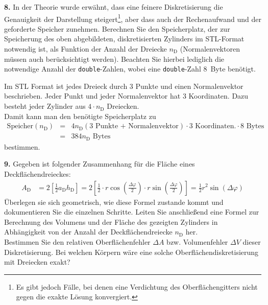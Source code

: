 \documentclass[Protokollheft.tex]{subfiles}
\begin{document}
	
	\begin{framed}
		\noindent \textbf{8.} In der Theorie wurde erwähnt, dass eine feinere Diskretisierung die Genauigkeit der Darstellung steigert\footnote{Es gibt jedoch Fälle, bei denen eine Verdichtung des Oberflächengitters nicht gegen die exakte Lösung konvergiert.}, aber dass auch der Rechenaufwand und der geforderte Speicher zunehmen.
		Berechnen Sie den Speicherplatz, der zur Speicherung des oben abgebildeten, diskretisierten Zylinders im STL-Format notwendig ist, als Funktion der Anzahl der Dreiecke $n_\mathrm{D}$ (Normalenvektoren müssen auch berücksichtigt werden). Beachten Sie hierbei lediglich die notwendige Anzahl der \lstinline{double}-Zahlen, wobei eine \lstinline{double}-Zahl \SI{8}{Byte} benötigt.\label{exer:requiredStorage}
	\end{framed}
	\noindent
	Im STL Format ist jedes Dreieck durch 3 Punkte und einen Normalenvektor beschrieben. Jeder Punkt und jeder Normalenvektor hat 3 Koordinaten. Dazu besteht jeder Zylinder aus $4 \cdot n_\text{D}$ Dreiecken.\\
	Damit kann man den benötigte Speicherplatz zu 
	\begin{eqnarray*}
		\text{Speicher}(n_\mathrm{D})&=&4n_\mathrm{D}(3\text{ Punkte + Normalenvektor})\cdot 3 \text{ Koordinaten.}\cdot 8\text{ Bytes}\\
		&=&384n_\mathrm{D} \text{ Bytes}
	\end{eqnarray*}
	bestimmen. 
	\begin{framed}
		\noindent \textbf{9.} Gegeben ist folgender Zusammenhang für die Fläche eines Deckflächendreieckes:
		\begin{align}
			A_\text{D} &= 2 \left[\frac12 a_\text{D} h_\text{D}\right] = 2 \left[ \frac12 \cdot r \cos\left(\frac{\Delta \varphi}{2}\right)\cdot r \sin\left(\frac{\Delta \varphi}{2}\right)  \right] = \frac12 r^2 \sin(\Delta\varphi)
		\end{align}
		Überlegen sie sich geometrisch, wie diese Formel zustande kommt und dokumentieren Sie die einzelnen Schritte. Leiten Sie anschließend eine Formel zur Berechnung des Volumens und der Fläche des gezeigten Zylinders in Abhängigkeit von der Anzahl der Deckflächendreiecke $n_\mathrm{D}$ her.\\
		Bestimmen Sie den relativen Oberflächenfehler $\Delta A$ bzw. Volumenfehler $\Delta V$ dieser Diskretisierung.
		Bei welchen Körpern wäre eine solche Oberflächendiskretisierung mit Dreiecken exakt?\label{exer:deltaAdeltaV}
	\end{framed}
\end{document}
